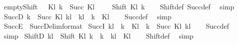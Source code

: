 \begin{isabellebody}
\ empty{\isacharunderscore}{\kern0pt}Shift{\isacharcolon}{\kern0pt}\ {\isachardoublequoteopen}{\isasymlbrakk}{\isacharbrackleft}{\kern0pt}{\isacharbrackright}{\kern0pt}\ {\isasymin}\ Kl{\isacharsemicolon}{\kern0pt}\ k\ {\isasymin}\ Succ\ Kl\ {\isacharbrackleft}{\kern0pt}{\isacharbrackright}{\kern0pt}{\isasymrbrakk}\ {\isasymLongrightarrow}\ {\isacharbrackleft}{\kern0pt}{\isacharbrackright}{\kern0pt}\ {\isasymin}\ Shift\ Kl\ k{\isachardoublequoteclose}\isanewline
%
\isadelimproof
\ \ %
\endisadelimproof
%
\isatagproof
{}\isamarkupfalse%
\ Shift{\isacharunderscore}{\kern0pt}def\ Succ{\isacharunderscore}{\kern0pt}def\ \isamarkupfalse%
\ simp%
\endisatagproof
{\isafoldproof}%
%
\isadelimproof
\isanewline
%
\endisadelimproof
\isanewline
{}\isamarkupfalse%
\ SuccD{\isacharcolon}{\kern0pt}\ {\isachardoublequoteopen}k\ {\isasymin}\ Succ\ Kl\ kl\ {\isasymLongrightarrow}\ kl\ {\isacharat}{\kern0pt}\ {\isacharbrackleft}{\kern0pt}k{\isacharbrackright}{\kern0pt}\ {\isasymin}\ Kl{\isachardoublequoteclose}\isanewline
%
\isadelimproof
\ \ %
\endisadelimproof
%
\isatagproof
{}\isamarkupfalse%
\ Succ{\isacharunderscore}{\kern0pt}def\ \isamarkupfalse%
\ simp%
\endisatagproof
{\isafoldproof}%
%
\isadelimproof
\isanewline
%
\endisadelimproof
\isanewline
{}\isamarkupfalse%
\ SuccE\ {\isacharequal}{\kern0pt}\ SuccD{\isacharbrackleft}{\kern0pt}elim{\isacharunderscore}{\kern0pt}format{\isacharbrackright}{\kern0pt}\isanewline
\isanewline
{}\isamarkupfalse%
\ SuccI{\isacharcolon}{\kern0pt}\ {\isachardoublequoteopen}kl\ {\isacharat}{\kern0pt}\ {\isacharbrackleft}{\kern0pt}k{\isacharbrackright}{\kern0pt}\ {\isasymin}\ Kl\ {\isasymLongrightarrow}\ k\ {\isasymin}\ Succ\ Kl\ kl{\isachardoublequoteclose}\isanewline
%
\isadelimproof
\ \ %
\endisadelimproof
%
\isatagproof
{}\isamarkupfalse%
\ Succ{\isacharunderscore}{\kern0pt}def\ \isamarkupfalse%
\ simp%
\endisatagproof
{\isafoldproof}%
%
\isadelimproof
\isanewline
%
\endisadelimproof
\isanewline
{}\isamarkupfalse%
\ ShiftD{\isacharcolon}{\kern0pt}\ {\isachardoublequoteopen}kl\ {\isasymin}\ Shift\ Kl\ k\ {\isasymLongrightarrow}\ k\ {\isacharhash}{\kern0pt}\ kl\ {\isasymin}\ Kl{\isachardoublequoteclose}\isanewline
%
\isadelimproof
\ \ %
\endisadelimproof
%
\isatagproof
{}\isamarkupfalse%
\ Shift{\isacharunderscore}{\kern0pt}def\ \isamarkupfalse%
\ simp%
\endisatagproof
{\isafoldproof}%
%
\isadelimproof
\isanewline
%
\endisadelimproof
\isanewline

\end{isabellebody}
